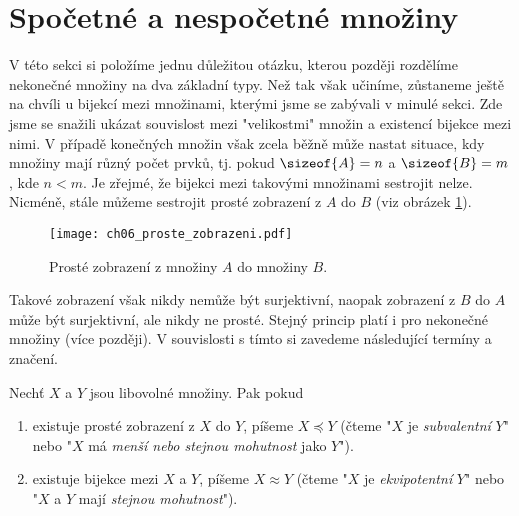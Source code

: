 \section{Spočetné a nespočetné množiny}\label{sec:spocetne_a_nespocetne_mnoziny}
V této sekci si položíme jednu důležitou otázku, kterou později rozdělíme nekonečné množiny na dva základní typy. Než tak však učiníme, zůstaneme ještě na chvíli u bijekcí mezi množinami, kterými jsme se zabývali v minulé sekci. Zde jsme se snažili ukázat souvislost mezi "velikostmi" množin a existencí bijekce mezi nimi. V případě konečných množin však zcela běžně může nastat situace, kdy množiny mají různý počet prvků, tj. pokud $\sizeof{A}=n$ a $\sizeof{B}=m$, kde $n<m$. Je zřejmé, že bijekci mezi takovými množinami sestrojit nelze. Nicméně, stále můžeme sestrojit prosté zobrazení z $A$ do $B$ (viz obrázek \ref{fig:proste_zobrazeni_A_do_B}).
\begin{figure}[H]
    \centering
    \texttt{[image: ch06\_proste\_zobrazeni.pdf]}
    \caption{Prosté zobrazení z množiny $A$ do množiny $B$.}
    \label{fig:proste_zobrazeni_A_do_B}
\end{figure}
Takové zobrazení však nikdy nemůže být surjektivní, naopak zobrazení z $B$ do $A$ může být surjektivní, ale nikdy ne prosté. Stejný princip platí i pro nekonečné množiny (více později). V souvislosti s tímto si zavedeme následující termíny a značení.
\begin{definition}
    Nechť $X$ a $Y$ jsou libovolné množiny. Pak pokud
    \begin{enumerate}[label=(\roman*)]
        \item existuje prosté zobrazení z $X$ do $Y$, píšeme $X\preceq Y$ (čteme "$X$ je \emph{subvalentní} $Y$" nebo "$X$ má \emph{menší nebo stejnou mohutnost} jako $Y$").
        \item existuje bijekce mezi $X$ a $Y$, píšeme $X\approx Y$ (čteme "$X$ je \emph{ekvipotentní} $Y$" nebo "$X$ a $Y$ mají \emph{stejnou mohutnost}").
    \end{enumerate}
\end{definition}
